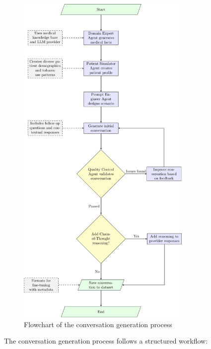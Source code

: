 \begin{figure}[h]
    \centering
    \includegraphics[width=0.75\textwidth]{Pictures/conversation_generation_flow.pdf}
    \caption{Flowchart of the conversation generation process}
    \label{fig:conversation_flow}
\end{figure}

The conversation generation process follows a structured workflow:

